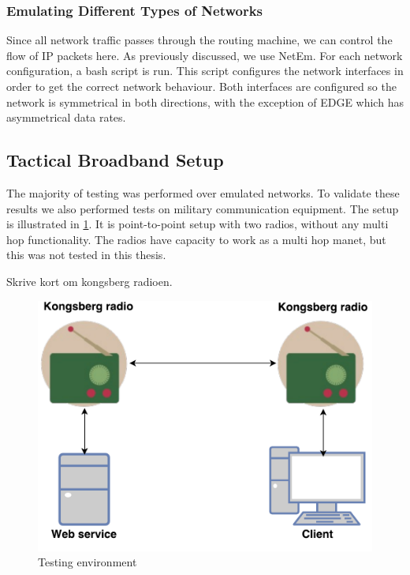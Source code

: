 \subsubsection{Emulating Different Types of Networks}

Since all network traffic passes through the routing machine, we can control the
flow of IP packets here. As previously discussed, we use NetEm.  For each
network configuration, a bash script is run. This script configures the network
interfaces in order to get the correct network behaviour. Both interfaces are
configured so the network is symmetrical in both directions, with the exception
of EDGE which has asymmetrical data rates.

\subsection{Tactical Broadband Setup}

The majority of testing was performed over emulated networks. To validate these
results we also performed tests on military communication equipment. The setup
is illustrated in \cref{figure-radio-testing-environment}. It is point-to-point
setup with two radios, without any multi hop functionality. The radios have
capacity to work as a multi hop \gls{manet}, but this was not tested in this
thesis.

Skrive kort om kongsberg radioen.

\begin{figure}[h]
\centering
\includegraphics[scale=0.6]{images/radio_testing_environment.pdf}
\caption{Testing environment}
\label{figure-radio-testing-environment}
\end{figure}

